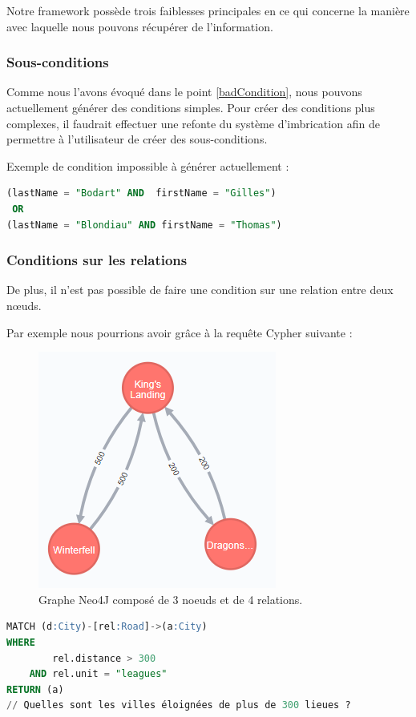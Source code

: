 \documentclass[a4paper,fleqn,12pt,oneside]{book}
\begin{document}
Notre framework possède trois faiblesses principales en ce qui concerne la manière avec laquelle nous pouvons récupérer de l'information.

\subsubsection*{\bf Sous-conditions}

Comme nous l'avons évoqué dans le point \ref{badCondition}, nous pouvons actuellement générer des conditions simples.
Pour créer des conditions plus complexes, il faudrait effectuer une refonte du système d'imbrication afin de permettre à l'utilisateur de créer des sous-conditions. 

Exemple de condition impossible à générer actuellement :
\begin{lstlisting}[language=SQL]
(lastName = "Bodart" AND  firstName = "Gilles") 
 OR 
(lastName = "Blondiau" AND firstName = "Thomas")
\end{lstlisting}


\subsubsection*{\bf Conditions sur les relations}
De plus, il n'est  pas possible de faire une condition sur une relation entre deux nœuds. 

Par exemple nous pourrions avoir grâce à la requête Cypher suivante : 

\begin{figure}[!ht]
\centering
\includegraphics[scale=0.8]{figures/citiesRel.png}
\caption{Graphe Neo4J composé de 3 noeuds et de 4 relations.}
\label{fig:citiesRel}
\end{figure}
 
\begin{lstlisting}[language=SQL]
MATCH (d:City)-[rel:Road]->(a:City)
WHERE
	    rel.distance > 300
	AND rel.unit = "leagues"
RETURN (a)
// Quelles sont les villes éloignées de plus de 300 lieues ?
\end{lstlisting} 
\end{document}
